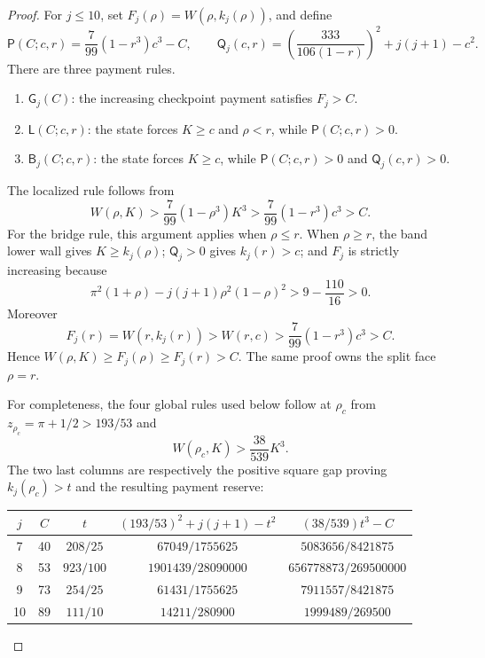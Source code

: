 \documentclass[11pt]{article}
\numberwithin{equation}{section}
\theoremstyle{definition}
\theoremstyle{remark}
\begin{document}
\begin{proof}
For \(j\leq10\), set \(F_j(\rho)=W(\rho,k_j(\rho))\), and define
\[
 \mathsf P(C;c,r)=\frac7{99}(1-r^3)c^3-C,
 \qquad
 \mathsf Q_j(c,r)=
 \left(\frac{333}{106(1-r)}\right)^2+j(j+1)-c^2.
\]
There are three payment rules.
\begin{enumerate}
\item \(\mathsf G_j(C)\): the increasing checkpoint payment satisfies
      \(F_j>C\).
\item \(\mathsf L(C;c,r)\): the state forces \(K\geq c\) and \(\rho<r\),
      while \(\mathsf P(C;c,r)>0\).
\item \(\mathsf B_j(C;c,r)\): the state forces \(K\geq c\), while
      \(\mathsf P(C;c,r)>0\) and \(\mathsf Q_j(c,r)>0\).
\end{enumerate}
The localized rule follows from
\[
 W(\rho,K)>
 \frac7{99}(1-\rho^3)K^3>
 \frac7{99}(1-r^3)c^3>C.
\]
For the bridge rule, this argument applies when \(\rho\leq r\).  When
\(\rho\geq r\), the band lower wall gives \(K\geq k_j(\rho)\);
\(\mathsf Q_j>0\) gives \(k_j(r)>c\); and \(F_j\) is strictly increasing
because
\[
 \pi^2(1+\rho)-j(j+1)\rho^2(1-\rho)^2
 >9-\frac{110}{16}>0.
\]
Moreover
\[
 F_j(r)=W(r,k_j(r))>W(r,c)>
 \frac7{99}(1-r^3)c^3>C.
\]
Hence \(W(\rho,K)\geq F_j(\rho)\geq F_j(r)>C\).  The same proof owns the
split face \(\rho=r\).

For completeness, the four global rules used below follow at
\(\rho_c\) from \(z_{\rho_c}=\pi+1/2>193/53\) and
\[
 W(\rho_c,K)>\frac{38}{539}K^3.
\]
The two last columns are respectively the positive square gap proving
\(k_j(\rho_c)>t\) and the resulting payment reserve:
\begin{center}
\scriptsize
\begin{tabular}{c|c|c|c|c}
\(j\)&\(C\)&\(t\)&\((193/53)^2+j(j+1)-t^2\)&
\((38/539)t^3-C\)\\ \hline
7&40&\(208/25\)&\(67049/1755625\)&\(5083656/8421875\)\\
8&53&\(923/100\)&\(1901439/28090000\)&
\(656778873/269500000\)\\
9&73&\(254/25\)&\(61431/1755625\)&\(7911557/8421875\)\\
10&89&\(111/10\)&\(14211/280900\)&\(1999489/269500\)
\end{tabular}
\end{center}


\end{proof}
\end{document}
